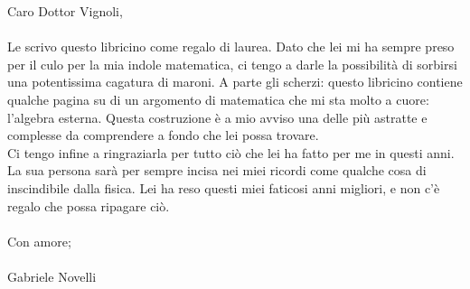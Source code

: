\documentclass[12pt,a4paper]{report}
\theoremstyle{definition}
\theoremstyle{Theorem}
\theoremstyle{definition}
\theoremstyle{definition}
\theoremstyle{definition}
\begin{document}
	\setpdftargetpages
	Caro Dottor Vignoli,\\
	\\
	Le scrivo questo libricino come regalo di laurea. Dato che lei mi ha sempre preso per il culo per la mia indole matematica, ci tengo a darle la possibilità di sorbirsi una potentissima cagatura di maroni. A parte gli scherzi: questo libricino contiene qualche pagina su di un argomento di matematica che mi sta molto a cuore: l'algebra esterna. Questa costruzione è a mio avviso una delle più astratte e complesse da comprendere a fondo che lei possa trovare.\\
	Ci tengo infine a ringraziarla per tutto ciò che lei ha fatto per me in questi anni. La sua persona sarà per sempre incisa nei miei ricordi come qualche cosa di inscindibile dalla fisica. Lei ha reso questi miei faticosi anni migliori, e non c'è regalo che possa ripagare ciò.\\
	\\
	Con amore;\\
	\\
	Gabriele Novelli
\end{document}
